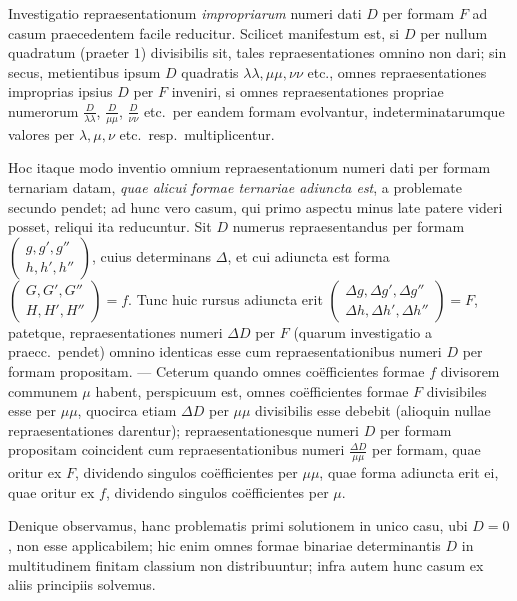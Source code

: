 Investigatio repraesentationum \textit{impropriarum} numeri dati $D$ per formam
$F$ ad casum praecedentem facile reducitur. Scilicet manifestum est, si $D$ per
nullum quadratum (praeter $1$) divisibilis sit, tales repraesentationes omnino non
dari; sin secus, metientibus ipsum $D$ quadratis $\lambda\lambda,\mu\mu,\nu\nu$
etc., omnes repraesentationes improprias ipsius $D$ per $F$ inveniri, si omnes
repraesentationes propriae numerorum $\frac{D}{\lambda\lambda}$,
$\frac{D}{\mu\mu}$, $\frac{D}{\nu\nu}$ etc.\ per eandem formam evolvantur,
indeterminatarumque valores per $\lambda,\mu,\nu$ etc.\ resp.\ multiplicentur.

Hoc itaque modo inventio omnium repraesentationum numeri dati per formam ternariam
datam, \textit{quae alicui formae ternariae adiuncta est}, a problemate secundo
pendet; ad hunc vero casum, qui primo aspectu minus late patere videri posset,
reliqui ita reducuntur. Sit $D$ numerus repraesentandus per formam
$\left(\begin{smallmatrix}g,g',g''\\h,h',h''\end{smallmatrix}\right)$,
cuius determinans $\Delta$, et cui adiuncta est forma
$\left(\begin{smallmatrix}G,G',G''\\H,H',H''\end{smallmatrix}\right)=f$.
Tunc huic rursus adiuncta erit
$\left(\begin{smallmatrix}\Delta g,\Delta g',\Delta g''\\\Delta h,\Delta h',\Delta h''\end{smallmatrix}\right)=F$,
patetque, repraesentationes numeri $\Delta D$ per $F$ (quarum investigatio a
praecc.\ pendet) omnino identicas esse cum repraesentationibus numeri $D$ per
formam propositam. --- Ceterum quando omnes coëfficientes formae $f$ divisorem
communem $\mu$ habent, perspicuum est, omnes coëfficientes formae $F$ divisibiles
esse per $\mu\mu$, quocirca etiam $\Delta D$ per $\mu\mu$ divisibilis esse
debebit (alioquin nullae repraesentationes darentur); repraesentationesque numeri
$D$ per formam propositam coincident cum repraesentationibus numeri
$\frac{\Delta D}{\mu\mu}$ per formam, quae oritur ex $F$, dividendo singulos
coëfficientes per $\mu\mu$, quae forma adiuncta erit ei, quae oritur ex $f$,
dividendo singulos coëfficientes per $\mu$.

Denique observamus, hanc problematis primi solutionem in unico casu, ubi
$D=0$, non esse applicabilem; hic enim omnes formae binariae determinantis $D$
in multitudinem finitam classium non distribuuntur; infra autem hunc casum ex
aliis principiis solvemus.

